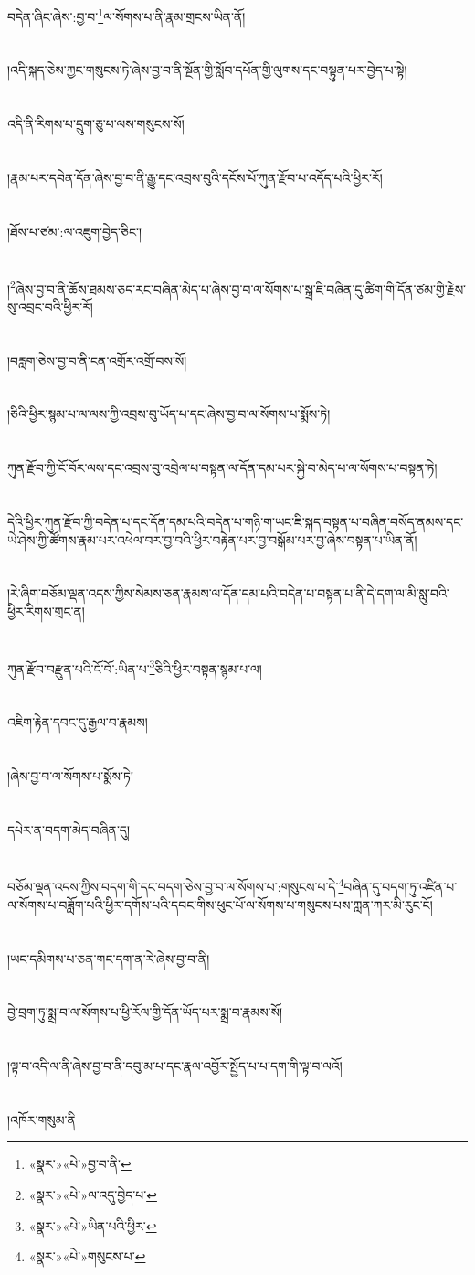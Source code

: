 བདེན་ཞིང་ཞེས་:བྱ་བ་\footnote{«སྣར་»«པེ་»བྱ་བ་ནི་}ལ་སོགས་པ་ནི་རྣམ་གྲངས་ཡིན་ནོ།\chapter{ }།འདི་སྐད་ཅེས་ཀྱང་གསུངས་ཏེ་ཞེས་བྱ་བ་ནི་སྔོན་གྱི་སློབ་དཔོན་གྱི་ལུགས་དང་བསྟུན་པར་བྱེད་པ་སྟེ།\chapter{ }འདི་ནི་རིགས་པ་དྲུག་ཅུ་པ་ལས་གསུངས་སོ།\chapter{ }།རྣམ་པར་དབེན་དོན་ཞེས་བྱ་བ་ནི་རྒྱུ་དང་འབྲས་བུའི་དངོས་པོ་ཀུན་རྫོབ་པ་འདོད་པའི་ཕྱིར་རོ།\chapter{ }།ཐོས་པ་ཙམ་:ལ་འཇུག་བྱེད་ཅིང་།\chapter{ }།\footnote{«སྣར་»«པེ་»ལ་འདུ་བྱེད་པ་}ཞེས་བྱ་བ་ནི་ཆོས་ཐམས་ཅད་རང་བཞིན་མེད་པ་ཞེས་བྱ་བ་ལ་སོགས་པ་སྒྲ་ཇི་བཞིན་དུ་ཚིག་གི་དོན་ཙམ་གྱི་རྗེས་སུ་འབྲང་བའི་ཕྱིར་རོ།\chapter{ }།བརླག་ཅེས་བྱ་བ་ནི་ངན་འགྲོར་འགྲོ་བས་སོ།\chapter{ }།ཅིའི་ཕྱིར་སྙམ་པ་ལ་ལས་ཀྱི་འབྲས་བུ་ཡོད་པ་དང་ཞེས་བྱ་བ་ལ་སོགས་པ་སྨོས་ཏེ།\chapter{ }ཀུན་རྫོབ་ཀྱི་ངོ་བོར་ལས་དང་འབྲས་བུ་འབྲེལ་པ་བསྟན་ལ་དོན་དམ་པར་སྐྱེ་བ་མེད་པ་ལ་སོགས་པ་བསྟན་ཏེ།\chapter{ }དེའི་ཕྱིར་ཀུན་རྫོབ་ཀྱི་བདེན་པ་དང་དོན་དམ་པའི་བདེན་པ་གཉི་ག་ཡང་ཇི་སྐད་བསྟན་པ་བཞིན་བསོད་ནམས་དང་ཡེ་ཤེས་ཀྱི་ཚོགས་རྣམ་པར་འཕེལ་བར་བྱ་བའི་ཕྱིར་བརྟེན་པར་བྱ་བསྒོམ་པར་བྱ་ཞེས་བསྟན་པ་ཡིན་ནོ།\chapter{ }།རེ་ཞིག་བཅོམ་ལྡན་འདས་ཀྱིས་སེམས་ཅན་རྣམས་ལ་དོན་དམ་པའི་བདེན་པ་བསྟན་པ་ནི་དེ་དག་ལ་མི་སླུ་བའི་ཕྱིར་རིགས་གྲང་ན།\chapter{ }ཀུན་རྫོབ་བརྫུན་པའི་ངོ་བོ་:ཡིན་པ་\footnote{«སྣར་»«པེ་»ཡིན་པའི་ཕྱིར་}ཅིའི་ཕྱིར་བསྟན་སྙམ་པ་ལ།\chapter{ }འཇིག་རྟེན་དབང་དུ་རྒྱལ་བ་རྣམས།\chapter{ }།ཞེས་བྱ་བ་ལ་སོགས་པ་སྨོས་ཏེ།\chapter{ }དཔེར་ན་བདག་མེད་བཞིན་དུ།\chapter{ }བཅོམ་ལྡན་འདས་ཀྱིས་བདག་གི་དང་བདག་ཅེས་བྱ་བ་ལ་སོགས་པ་:གསུངས་པ་དེ་\footnote{«སྣར་»«པེ་»གསུངས་པ་}བཞིན་དུ་བདག་ཏུ་འཛིན་པ་ལ་སོགས་པ་བཟློག་པའི་ཕྱིར་དགོས་པའི་དབང་གིས་ཕུང་པོ་ལ་སོགས་པ་གསུངས་པས་ཀླན་ཀར་མི་རུང་ངོ།\chapter{ }།ཡང་དམིགས་པ་ཅན་གང་དག་ན་རེ་ཞེས་བྱ་བ་ནི།\chapter{ }བྱེ་བྲག་ཏུ་སྨྲ་བ་ལ་སོགས་པ་ཕྱི་རོལ་གྱི་དོན་ཡོད་པར་སྨྲ་བ་རྣམས་སོ།\chapter{ }།ལྟ་བ་འདི་ལ་ནི་ཞེས་བྱ་བ་ནི་དབུ་མ་པ་དང་རྣལ་འབྱོར་སྤྱོད་པ་པ་དག་གི་ལྟ་བ་ལའོ།\chapter{ }།འཁོར་གསུམ་ནི